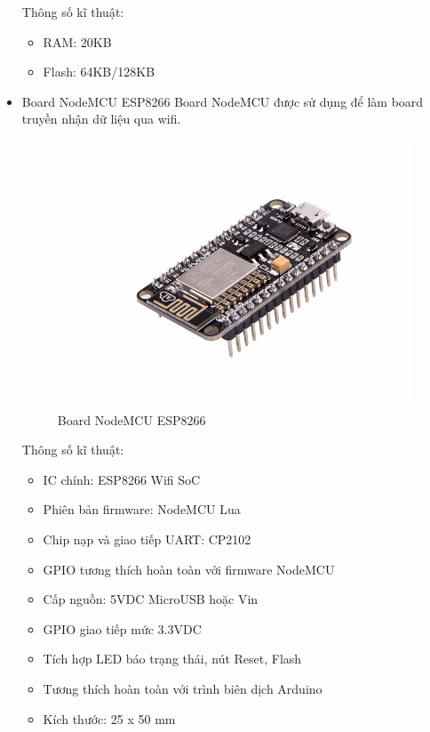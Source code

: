 \documentclass[a4paper,12pt,oneside]{article}
\begin{document}
\begin{itemize}
\noindent Thông số kĩ thuật:
\begin{itemize}
\item RAM: 20KB
\item Flash: 64KB/128KB
\end{itemize}

\item Board NodeMCU ESP8266
\noindent Board NodeMCU được sử dụng để làm board truyền nhận dữ liệu qua wifi.\\
\begin{figure}[h!]
\centering
\includegraphics[scale=.4]{hinh/NodeMCU.jpg}
\caption{Board NodeMCU ESP8266}
\end{figure}
\noindent Thông số kĩ thuật:
	\begin{itemize}
	\item IC chính: ESP8266 Wifi SoC
	\item Phiên bản firmware: NodeMCU Lua
	\item Chip nạp và giao tiếp UART: CP2102
	\item GPIO tương thích hoàn toàn với firmware NodeMCU
	\item Cấp nguồn: 5VDC MicroUSB hoặc Vin
	\item GPIO giao tiếp mức 3.3VDC
	\item Tích hợp LED báo trạng thái, nút Reset, Flash
	\item Tương thích hoàn toàn với trình biên dịch Arduino
	\item Kích thước: 25 x 50 mm
	\end{itemize}

\end{itemize}
\end{document}
